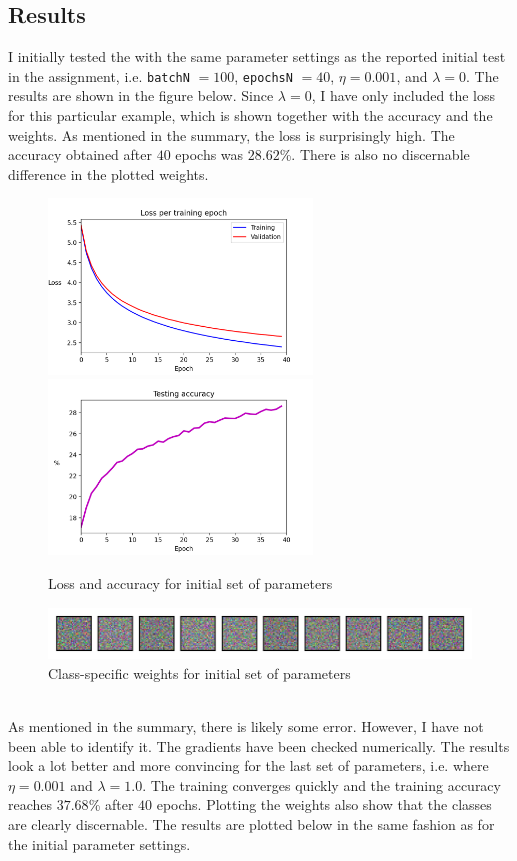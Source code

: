 \documentclass{article}
\begin{document}
\subsection*{Results}
	I initially tested the with the same parameter settings as the reported initial test in the assignment, i.e. \texttt{batchN} $=100$, \texttt{epochsN} $=40$, $\eta = 0.001$, and $\lambda = 0$. The results are shown in the figure below. Since $\lambda=0$, I have only included the loss for this particular example, which is shown together with the accuracy and the weights. As mentioned in the summary, the loss is surprisingly high. The accuracy obtained after $40$ epochs was $28.62$\%. There is also no discernable difference in the plotted weights. 
	\begin{figure}[h!]
		\centering
		\includegraphics[width=7cm]{../plots/loss_v2.png}
		\includegraphics[width=7cm]{../plots/acc_v2.png}
		\caption{Loss and accuracy for initial set of parameters}
		\vspace{0.2cm}
		\includegraphics[width=12cm]{../plots/weights_v2.png}
		\caption{Class-specific weights for initial set of parameters}
	\end{figure}\\
	As mentioned in the summary, there is likely some error. However, I have not been able to identify it. The gradients have been checked numerically. The results look a lot better and more convincing for the last set of parameters, i.e. where $\eta=0.001$ and $\lambda=1.0$. The training converges quickly and the training accuracy reaches $37.68$\% after $40$ epochs. Plotting the weights also show that the classes are clearly discernable. The results are plotted below in the same fashion as for the initial parameter settings.
\end{document}
